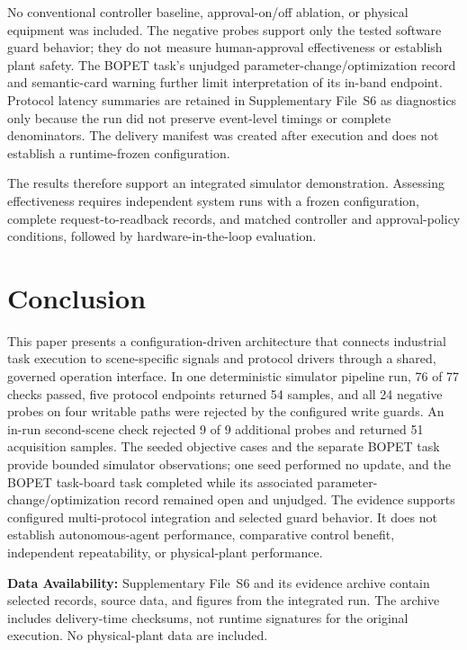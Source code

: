 No conventional controller baseline, approval-on/off ablation, or physical
equipment was included. The negative probes support only the tested software
guard behavior; they do not measure human-approval effectiveness or establish
plant safety. The BOPET task's unjudged parameter-change/optimization record
and semantic-card warning further limit interpretation of its in-band endpoint.
Protocol latency summaries are retained in Supplementary File~S6 as
diagnostics only because the run did not
preserve event-level timings or complete denominators. The delivery manifest
was created after execution and does not establish a runtime-frozen
configuration.

The results therefore support an integrated simulator demonstration. Assessing
effectiveness requires independent system runs with a frozen configuration,
complete request-to-readback records, and matched controller and
approval-policy conditions, followed by hardware-in-the-loop evaluation.

\section{Conclusion}
\label{sec:conclusion}
This paper presents a configuration-driven architecture that connects
industrial task execution to scene-specific signals and protocol drivers
through a shared, governed operation interface. In one deterministic
simulator pipeline run, 76 of 77 checks passed, five protocol endpoints
returned 54 samples, and all 24 negative probes on four writable paths were
rejected by the configured write guards. An in-run second-scene check rejected 9 of
9 additional probes and returned 51 acquisition samples. The seeded objective
cases and the separate BOPET task provide bounded simulator observations; one
seed performed no update, and the BOPET task-board task completed while its
associated parameter-change/optimization record remained open and unjudged.
The evidence supports configured multi-protocol integration and selected guard
behavior. It does not establish
autonomous-agent performance, comparative control benefit, independent
repeatability, or physical-plant performance.

\noindent\textbf{Data Availability:} Supplementary File~S6 and its evidence
archive contain selected records, source data, and figures from the integrated
run. The archive includes delivery-time checksums, not runtime signatures for
the original execution. No physical-plant data are included.
